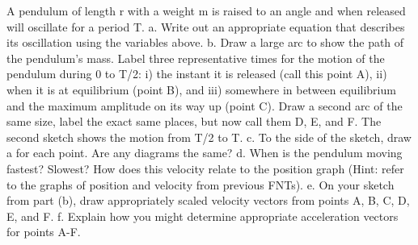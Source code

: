 \label{fnt8.3.1-1}

A pendulum of length r with a weight m is raised to an angle \thetamax and when released will oscillate for a period T.
a.	Write out an appropriate equation that describes its oscillation using the variables above.
b.	Draw a large arc to show the path of the pendulum's mass.  Label three representative times for the motion of the pendulum during 0 to T/2: i) the instant it is released (call this point A), ii) when it is at equilibrium (point B), and iii) somewhere in between equilibrium and the maximum amplitude on its way up (point C).  Draw a second arc of the same size, label the exact same places, but now call them D, E, and F.  The second sketch shows the motion from T/2 to T.
c.	To the side of the sketch, draw a \forcediag{} for each point.  Are any diagrams the same?
d.	When is the pendulum moving fastest?  Slowest?  How does this velocity relate to the position graph (Hint: refer to the graphs of position and velocity from previous FNTs).
e.	On your sketch from part (b), draw appropriately scaled velocity vectors from points A, B, C, D, E, and F.
f.	Explain how you might determine appropriate acceleration vectors for points A-F.